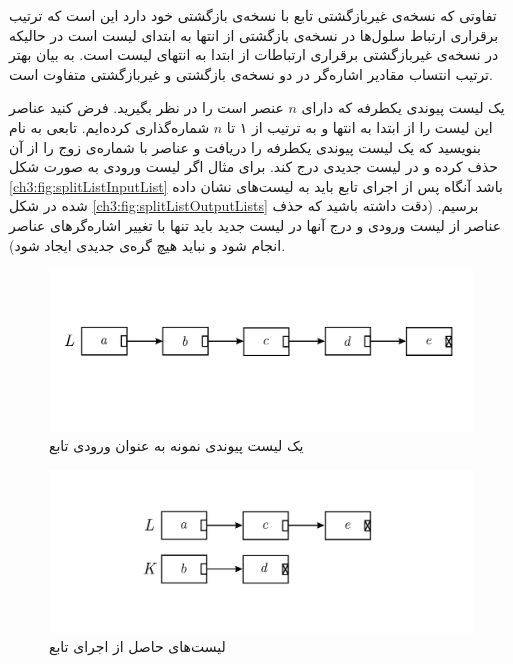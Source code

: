 تفاوتی که نسخه‌ی غیربازگشتی تابع {} با نسخه‌ی بازگشتی خود دارد این است که ترتیب برقراری ارتباط سلول‌ها در نسخه‌ی بازگشتی از انتها به ابتدای لیست است در حالیکه در نسخه‌ی غیربازگشتی برقراری ارتباطات از ابتدا به انتهای لیست است. به بیان بهتر ترتیب انتساب مقادیر اشاره‌گر {} در دو نسخه‌ی بازگشتی و غیربازگشتی متفاوت است.

 یک لیست پیوندی یکطرفه‌ که دارای {$n$} عنصر است را در نظر بگیرید. فرض کنید عناصر این لیست را از ابتدا به انتها و به ترتیب از ۱ تا {$n$} شماره‌گذاری کرده‌ایم. تابعی به نام {} بنویسید که یک لیست پیوندی یکطرفه را دریافت و عناصر با شماره‌ی زوج را از آن حذف کرده و در لیست جدیدی درج کند. برای مثال اگر لیست ورودی به صورت شکل {\eqref{ch3:fig:splitListInputList}} باشد آنگاه پس از اجرای تابع باید به لیست‌های نشان داده شده در شکل {\eqref{ch3:fig:splitListOutputLists}} برسیم. (دقت داشته باشید که حذف عناصر از لیست ورودی و درج آنها در لیست جدید باید تنها با تغییر اشاره‌گرهای عناصر انجام شود و نباید هیچ گره‌‌ی جدیدی ایجاد شود).

\begin{figure}
\begin{center}
\includegraphics[scale=0.33]{figs/ch3/split_list_input_list.pdf}
\caption{یک لیست پیوندی نمونه به عنوان ورودی تابع {}}\label{ch3:fig:splitListInputList}
\end{center}
\end{figure}

\begin{figure}
\begin{center}
\includegraphics[scale=0.33]{figs/ch3/split_list_output_lists.pdf}
\caption{لیست‌های حاصل از اجرای تابع {}}\label{ch3:fig:splitListOutputLists}
\end{center}
\end{figure}

